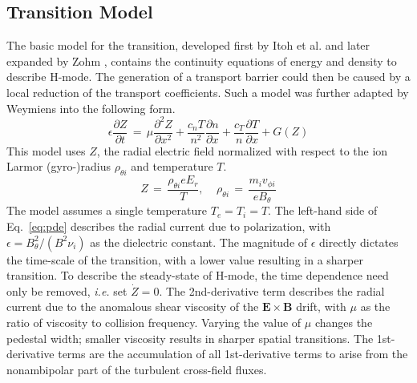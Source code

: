 \documentclass[a4paper]{article}
\begin{document}


\subsection{Transition Model}
The basic model for the transition, developed first by Itoh et al. \cite{itoh_edge_1991} and later expanded by Zohm \cite{zohm_dynamic_1994}, contains the continuity equations of energy and density to describe H-mode.
The generation of a transport barrier could then be caused by a local reduction of the transport coefficients.
Such a model was further adapted by Weymiens \cite{weymiens_bifurcation_2014} into the following form.
\begin{equation}
	\epsilon \frac{\partial Z}{\partial t} \,=\, \mu \frac{\partial^2 Z}{\partial x^2} + \frac{c_n T}{n^2} \frac{\partial n}{\partial x} + \frac{c_T}{n} \frac{\partial T}{\partial x} + G(Z)
	\label{eq:pde}
\end{equation}
This model uses $Z$, the radial electric field normalized with respect to the ion Larmor (gyro-)radius $\rho_{\theta i}$ and temperature $T$.
\begin{equation}
	Z \,=\, \frac{\rho_{\theta i} e E_r}{T}, ~~~~~ \rho_{\theta i} \,=\, \frac{m_i v_{\phi i}}{e B_\theta}
	\label{eq:normalization}
\end{equation}
The model assumes a single temperature $T_e = T_i = T$.
The left-hand side of Eq.~\ref{eq:pde} describes the radial current due to polarization, with $\epsilon = B_\theta^2 / (B^2 \nu_i)$ as the dielectric constant.
The magnitude of $\epsilon$ directly dictates the time-scale of the transition, with a lower value resulting in a sharper transition.
To describe the steady-state of H-mode, the time dependence need only be removed, \emph{i.e.} set $\dot{Z} = 0$.
The 2nd-derivative term describes the radial current due to the anomalous shear viscosity of the $\mathbf{E}\times\mathbf{B}$ drift, with $\mu$ as the ratio of viscosity to collision frequency.
Varying the value of $\mu$ changes the pedestal width; smaller viscosity results in sharper spatial transitions.
The 1st-derivative terms are the accumulation of all 1st-derivative terms to arise from the nonambipolar part of the turbulent cross-field fluxes.
\end{document}
